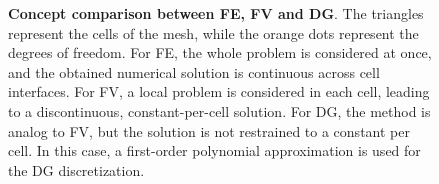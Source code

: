 \begin{figure}[h!]
\centering
\qquad
{}\qquad
{}
\caption[Comparison between finite elements, finite volumes and discontinuous Galerkin]{\textbf{Concept comparison between FE, FV and DG}. The triangles represent the cells of the mesh, while the orange dots represent the degrees of freedom. For FE, the whole problem is considered at once, and the obtained numerical solution is continuous across cell interfaces. For FV, a local problem is considered in each cell, leading to a discontinuous, constant-per-cell solution. For DG, the method is analog to FV, but the solution is not restrained to a constant per cell. In this case, a first-order polynomial approximation is used for the DG discretization.}
\label{fig:methods}
\end{figure}
